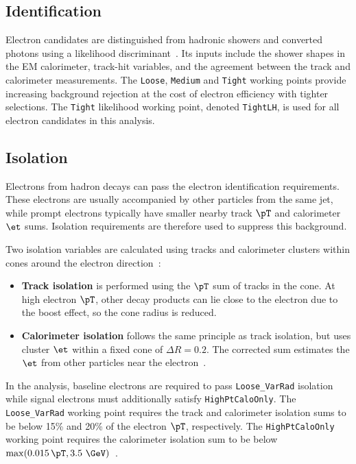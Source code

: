 \subsection{Identification}

Electron candidates are distinguished from hadronic showers and converted photons using a likelihood discriminant~\cite{ATLAS2019ElectronReco}.
Its inputs include the shower shapes in the EM calorimeter, track-hit variables, and the agreement between the track and calorimeter measurements.
The \texttt{Loose}, \texttt{Medium} and \texttt{Tight} working points provide increasing background rejection at the cost of electron efficiency with tighter selections.
The \texttt{Tight} likelihood working point, denoted \texttt{TightLH}, is used for all electron candidates in this analysis.

\subsection{Isolation}

Electrons from hadron decays can pass the electron identification requirements.
These electrons are usually accompanied by other particles from the same jet, while prompt electrons typically have smaller nearby track $\pT$ and calorimeter $\et$ sums.
Isolation requirements are therefore used to suppress this background.

Two isolation variables are calculated using tracks and calorimeter clusters within cones around the electron direction~\cite{ATLAS2019ElectronPerformance}:
\begin{itemize}
    \item \textbf{Track isolation} is performed using the $\pT$ sum of tracks in the cone. At high electron $\pT$, other decay products can lie close to the electron due to the boost effect, so the cone radius is reduced.
    \item \textbf{Calorimeter isolation} follows the same principle as track isolation, but uses cluster $\et$ within a fixed cone of $\Delta R=0.2$. The corrected sum estimates the $\et$ from other particles near the electron~\cite{ATLAS2019ElectronPerformance}.
\end{itemize}
In the analysis, baseline electrons are required to pass \texttt{Loose\_VarRad} isolation while signal electrons must additionally satisfy \texttt{HighPtCaloOnly}.
The \texttt{Loose\_VarRad} working point requires the track and calorimeter isolation sums to be below 15\% and 20\% of the electron $\pT$, respectively.
The \texttt{HighPtCaloOnly} working point requires the calorimeter isolation sum to be below $\max(0.015\,\pT,3.5~\GeV)$~\cite{ATLAS2019ElectronPerformance}.

